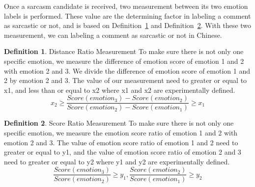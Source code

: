 \documentclass[12pt,a4paper]{report}
\theoremstyle{definition}
\newtheorem{definition}{Definition}[chapter]
\begin{document}
\begin{CJK}{UTF8}{bsmi}
    \par Once a sarcasm candidate is received, two measurement between its two emotion labels is performed. These value are the determining factor in labeling a comment as sarcastic or not, and is based on Definition~\ref{def:dist_rat} and Definition~\ref{def:score_rat}. With these two measurement, we can labeling a comment as sarcastic or not in Chinese.
    \begin{definition}{Distance Ratio Measurement}
    \label{def:dist_rat}
    \newline
    To make sure there is not only one specific emotion, we measure the difference of emotion score of emotion 1 and 2 with emotion 2 and 3.
    We divide the difference of emotion score of emotion 1 and 2 by emotion 2 and 3.
    The value of our measurement need to greater or equal to x1, and less than or equal to x2 where x1 and x2 are experimentally defined.
    \newline
    \begin{equation}
    x_2 \geq\frac{Score(emotion_3) - Score(emotion_2)}{Score(emotion_2) - Score(emotion_1)} \geq x_1 
    \end{equation}
    \end{definition}
    \begin{definition}{Score Ratio Measurement}
    \label{def:score_rat}
    \newline
    To make sure there is not only one specific emotion, we measure the emotion score ratio of emotion 1 and 2 with emotion 2 and 3.
    The value of emotion score ratio of emotion 1 and 2 need to greater or equal to y1, and the value of emotion score ratio of emotion 2 and 3 need to greater or equal to y2 where y1 and y2 are experimentally defined.
    \newline
    \begin{equation}
    \frac{Score(emotion_3)}{Score(emotion_2)}\geq y_1 , \frac{Score(emotion_2)}{Score(emotion_1)} \geq y_2
    \end{equation}
    \end{definition}



\end{CJK}
\end{document}
